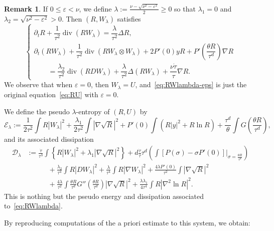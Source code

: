 \documentclass[11pt]{article}
\theoremstyle{definition}
\newtheorem{rema}[theo]{Remark}
\numberwithin{equation}{section}
\numberwithin{figure}{section}
\numberwithin{table}{section}
\DeclareMathOperator{\DIV}{div}
\newcommand*\<{\left\langle}
\renewcommand*\>{\right\rangle}
\renewcommand*\le{\leqslant}
\renewcommand*\ge{\geqslant}
\newcommand*\eps{\varepsilon}
\begin{document}
\begin{rema}\label{rem:RWlambda-eps}
If $0 \le \eps < \nu$, we define $\lambda := \frac{\nu - \sqrt{\nu^2 - \eps^2}}{2} \ge 0$ so that $\lambda_1 = 0$ and $\lambda_2 = \sqrt{\nu^2 - \eps^2} >0$. Then $(R, W_{\lambda})$ satisfies
\begin{equation}\label{eq:RWlambda-eps}
\begin{cases}
\partial_t R + \dfrac{1}{\tau^2}\DIV(R W_{\lambda})=\dfrac{\lambda}{\tau^2} \Delta R,\\
\partial_t (R W_{\lambda}) + \dfrac{1}{\tau^2} \DIV (R W_{\lambda} \otimes W_{\lambda}) + 2 P'(0) y R + P' \left(\dfrac{\theta R}{\tau^d} \right) \nabla R \\
\qquad = \dfrac{\lambda_2}{\tau^2} \DIV(R D W_{\lambda}) +\dfrac{\lambda}{\tau^2} \Delta(R W_{\lambda}) + \dfrac{\nu \dot \tau}{\tau}\nabla R.
\end{cases}
\end{equation}
We observe that when $\eps = 0$, then $W_{\lambda} = U$, and~\eqref{eq:RWlambda-eps} is just the original equation~\eqref{eq:RU} with $\eps = 0$.
\end{rema}

We define the pseudo $\lambda$-entropy of $(R,U)$ by
\begin{equation*}
\mathcal E_\lambda :=
\frac{1}{2\tau^2}\int R|W_\lambda|^2 +\frac{\lambda_1}{2\tau^2} \int|\nabla \sqrt R|^2 + P'(0)\int (R|y|^2 + R \ln R) + \frac{\tau^d}{\theta}\int G\left(\frac{\theta R}{\tau^d}\right),
\end{equation*}
and its associated dissipation
\begin{align*}
\mathcal D_\lambda &:= \frac{\dot \tau}{\tau^3}\int \left\{ R |W_\lambda|^2 + \lambda_1 |\nabla \sqrt R|^2 \right\} + d\frac{\dot \tau}{\tau} \tau^d \left(\int \left[P\left(\sigma\right) -\sigma P'(0) \right] \big|_{\sigma= \frac{\theta R}{\tau^d}} \right) \\
&\qquad\quad + \frac{\lambda_2}{\tau^4} \int R |D W_\lambda|^2 + \frac{\lambda}{\tau^4} \int R |\nabla W_\lambda|^2 + \frac{4\lambda P'(0)}{\tau^2} \int |\nabla \sqrt R|^2 \\
&\qquad\quad + \frac{4\lambda}{\tau^2} \int \frac{\theta R}{\tau^d} G'' \left(\tfrac{\theta R}{\tau^d} \right) |\nabla \sqrt R|^2 + \frac{\lambda \lambda_1}{4 \tau^4} \int R |\nabla^2 \ln R |^2.
\end{align*}
This is nothing but the pseudo energy and dissipation associated to~\eqref{eq:RWlambda}.

By reproducing computations of the a priori estimate to this system, we obtain:
\end{document}
